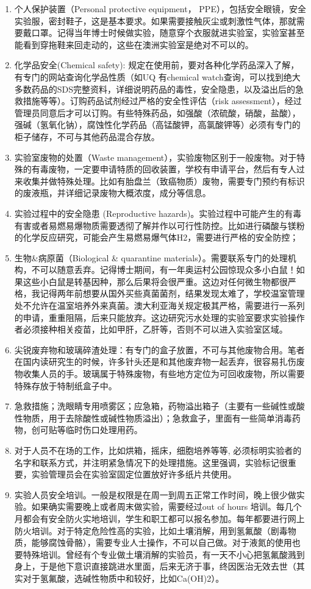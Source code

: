 \documentclass[
]{book}
\begin{document}
\begin{enumerate}
\def\labelenumi{\alph{enumi}.}
\item
  个人保护装置（Personal protective equipment， PPE），包括安全眼镜，安全实验服，密封鞋子，这是基本要求。如果需要接触灰尘或刺激性气体，那就需要戴口罩。记得当年博士时候做实验，随意穿个衣服就进实验室，实验室甚至能看到穿拖鞋来回走动的，这些在澳洲实验室是绝对不可以的。
\item
  化学品安全(Chemical safety): 规定在使用前，要对各种化学药品深入了解，有专门的网站查询化学品性质（如UQ 有chemical watch查询，可以找到绝大多数药品的SDS完整资料，详细说明药品的毒性，安全隐患，以及溢出后的急救措施等等）。订购药品试剂经过严格的安全性评估（risk assessment），经过管理员同意后才可以订购。有些特殊药品，如强酸（浓硫酸，硝酸，盐酸），强碱（氢氧化钠），腐蚀性化学药品（高锰酸钾，高氯酸钾等）必须有专门的柜子储存，不可与其他药品混合存放。
\item
  实验室废物的处置（Waste management），实验废物区别于一般废物。对于特殊的有毒废物，一定要申请特质的回收装置，学校有申请平台，然后有专人过来收集并做特殊处理。比如有胎盘兰（致癌物质）废物，需要专门预约有标识的废液瓶，并详细记录废物大概浓度，成分等信息。
\item
  实验过程中的安全隐患 (Reproductive hazards)。实验过程中可能产生的有毒有害或者易燃易爆物质需要透彻了解并作以可行性防控。比如进行磷酸与镁粉的化学反应研究，可能会产生易燃易爆气体H2，需要进行严格的安全防控；
\item
  生物\&病原菌（Biological \& quarantine materials）。需要联系专门的处理机构，不可以随意丢弃。记得博士期间，有一年奥运村公园惊现众多小白鼠！如果这些小白鼠是转基因种，那么后果将会很严重。这边对任何微生物都很严格，我记得两年前想要从国外买些真菌菌剂，结果发现太难了，学校温室管理处不允许在温室培养外来真菌。澳大利亚海关规定极其严格，需要进行一系列的申请，重重阻隔，后来只能放弃。这边研究污水处理的实验室要求实验操作者必须接种相关疫苗，比如甲肝，乙肝等，否则不可以进入实验室区域。
\item
  尖锐废弃物和玻璃碎渣处理：有专门的盒子放置，不可与其他废物合用。笔者在国内读研究生的时候，许多针头还是和其他废弃物一起丢弃，很容易扎伤废物收集人员的手。玻璃属于特殊废物，有些地方定位为可回收废物，所以需要特殊存放于特制纸盒子中。
\item
  急救措施；洗眼睛专用喷雾区；应急箱，药物溢出箱子（主要有一些碱性或酸性物质，用于去除酸性或碱性物质溢出）；急救盒子，里面有一些简单消毒药物，创可贴等临时伤口处理用药。
\item
  对于人员不在场的工作，比如烘箱，摇床，细胞培养等等, 必须标明实验者的名字和联系方式，并注明紧急情况下的处理措施。这里强调，实验标记很重要，实验管理员会在实验室固定位置放好许多纸片共使用。
\item
  实验人员安全培训。一般是权限是在周一到周五正常工作时间，晚上很少做实验。如果确实需要晚上或者周末做实验，需要经过out of hours 培训。每几个月都会有安全防火实地培训，学生和职工都可以报名参加。每年都要进行网上防火培训。对于特定危险性高的实验，比如土壤消解，用到氢氟酸（剧毒物质，能够腐蚀骨骼），需要专业人士操作，不可以自己做。对于液氮的使用也要特殊培训。曾经有个专业做土壤消解的实验员，有一天不小心把氢氟酸溅到身上，于是他下意识直接跳进水里面，后来无济于事，终因医治无效去世（其实对于氢氟酸，选碱性物质中和较好，比如Ca(OH)2）。
\end{enumerate}
\end{document}
